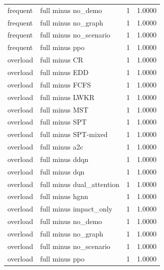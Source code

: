 \begin{tabular}{llll}
frequent & full minus no\_demo & 1 & 1.0000\\
frequent & full minus no\_graph & 1 & 1.0000\\
frequent & full minus no\_scenario & 1 & 1.0000\\
frequent & full minus ppo & 1 & 1.0000\\
overload & full minus CR & 1 & 1.0000\\
overload & full minus EDD & 1 & 1.0000\\
overload & full minus FCFS & 1 & 1.0000\\
overload & full minus LWKR & 1 & 1.0000\\
overload & full minus MST & 1 & 1.0000\\
overload & full minus SPT & 1 & 1.0000\\
overload & full minus SPT-mixed & 1 & 1.0000\\
overload & full minus a2c & 1 & 1.0000\\
overload & full minus ddqn & 1 & 1.0000\\
overload & full minus dqn & 1 & 1.0000\\
overload & full minus dual\_attention & 1 & 1.0000\\
overload & full minus hgnn & 1 & 1.0000\\
overload & full minus impact\_only & 1 & 1.0000\\
overload & full minus no\_demo & 1 & 1.0000\\
overload & full minus no\_graph & 1 & 1.0000\\
overload & full minus no\_scenario & 1 & 1.0000\\
overload & full minus ppo & 1 & 1.0000\\
\bottomrule
\end{tabular}